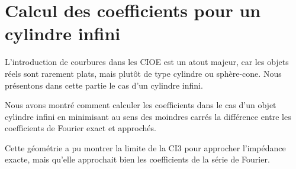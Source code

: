 \chapter{Calcul des coefficients pour un cylindre infini}
\label{sec:cylindre}
\minitoc
\newpage
{}
L'introduction de courbures dans les CIOE est un atout majeur, car les objets réels sont rarement plats, mais plutôt de type cylindre ou sphère-cone. Nous présentons dans cette partie le cas d'un cylindre infini.






Nous avons montré comment calculer les coefficients dans le cas d'un objet cylindre infini en minimisant au sens des moindres carrés la différence entre les coefficients de Fourier exact et approchés. 

Cette géométrie a pu montrer la limite de la CI3 pour approcher l'impédance exacte, mais qu'elle approchait bien les coefficients de la série de Fourier.
